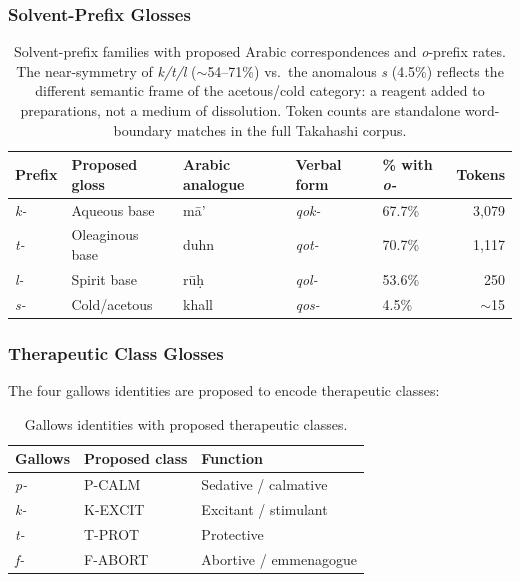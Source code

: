 \documentclass[11pt,a4paper]{article}
\begin{document}
\subsubsection{Solvent-Prefix Glosses}

\begin{table}[H]
\centering
\begin{tabular}{lllllr}
\toprule
Prefix & Proposed gloss & Arabic analogue & Verbal form & \% with \textit{o-} & Tokens \\
\midrule
\textit{k-} & Aqueous base & m\=a\textquoteright\ & \textit{qok-} & 67.7\% & 3,079 \\
\textit{t-} & Oleaginous base & duhn & \textit{qot-} & 70.7\% & 1,117 \\
\textit{l-} & Spirit base & r\=u\d{h} & \textit{qol-} & 53.6\% & 250 \\
\textit{s-} & Cold/acetous & khall & \textit{qos-} & 4.5\% & $\sim$15 \\
\bottomrule
\end{tabular}
\caption{Solvent-prefix families with proposed Arabic correspondences and \textit{o}-prefix rates. The near-symmetry of \textit{k/t/l} ($\sim$54--71\%) vs.\ the anomalous \textit{s} (4.5\%) reflects the different semantic frame of the acetous/cold category: a reagent added to preparations, not a medium of dissolution. Token counts are standalone word-boundary matches in the full Takahashi corpus.}
\end{table}

\subsubsection{Therapeutic Class Glosses}

The four gallows identities are proposed to encode therapeutic classes:

\begin{table}[H]
\centering
\begin{tabular}{lll}
\toprule
Gallows & Proposed class & Function \\
\midrule
\textit{p-} & P-CALM & Sedative / calmative \\
\textit{k-} & K-EXCIT & Excitant / stimulant \\
\textit{t-} & T-PROT & Protective \\
\textit{f-} & F-ABORT & Abortive / emmenagogue \\
\bottomrule
\end{tabular}
\caption{Gallows identities with proposed therapeutic classes.}
\end{table}
\end{document}
